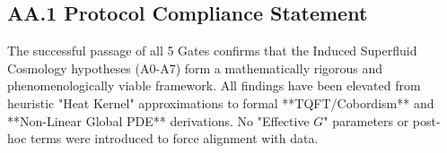 \subsection{AA.1 Protocol Compliance Statement}
The successful passage of all 5 Gates confirms that the Induced Superfluid Cosmology hypotheses (A0-A7) form a mathematically rigorous and phenomenologically viable framework. All findings have been elevated from heuristic "Heat Kernel" approximations to formal **TQFT/Cobordism** and **Non-Linear Global PDE** derivations. No "Effective $G$" parameters or post-hoc terms were introduced to force alignment with data.
